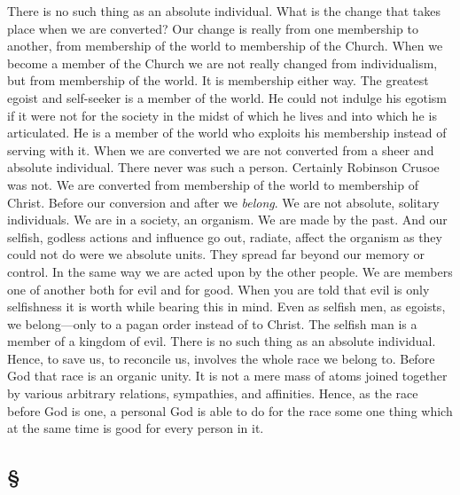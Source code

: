 \documentclass[draft]{ptfdoc}
\begin{document}
There is no such thing as an absolute individual. 
What is the change that takes place 
when we are converted? Our change is really 
from one membership to another, from membership 
of the world to membership of the Church. 
When we become a member of the Church we are 
not really changed from individualism, but from 
membership of the world. It is membership 
either way. The greatest egoist and self-seeker 
is a member of the world. He could not indulge 
his egotism if it were not for the society in the 
midst of which he lives and into which he is 
articulated. He is a member of the world who 
exploits his membership instead of serving with 
it. When we are converted we are not converted 
from a sheer and absolute individual. 
There never was such a person. Certainly 
Robinson Crusoe was not. We are converted 
from membership of the world to membership 
of Christ. Before our conversion and after 
we \textit{belong}. We are not absolute, solitary individuals. 
We are in a society, an organism. 
We are made by the past. And our selfish, 
godless actions and influence go out, radiate, 
affect the organism as they could not do were 
we absolute units. They spread far beyond our 
memory or control. In the same way we are 
acted upon by the other people. We are members 
one of another both for evil and for good. 
When you are told that evil is only selfishness it 
is worth while bearing this in mind. Even as selfish 
men, as egoists, we belong---only to a pagan 
order instead of to Christ. The selfish man is a 
member of a kingdom of evil. There is no such 
thing as an absolute individual. Hence, to save 
us, to reconcile us, involves the whole race we 
belong to. Before God that race is an organic 
unity. It is not a mere mass of atoms joined 
together by various arbitrary relations, sympathies, 
and affinities. Hence, as the race before 
God is one, a personal God is able to do for the 
race some one thing which at the same time is 
good for every person in it. 

\subsection*{
\S
}
\end{document}
